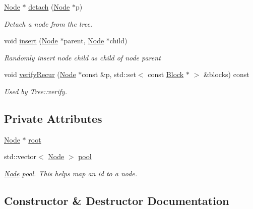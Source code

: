 \begin{DoxyCompactItemize}
\hyperlink{structTTree_1_1Node}{Node} $\ast$ \hyperlink{classTTree_ab9b74f48afd54c16fd1dc3b598019f7f}{detach} (\hyperlink{structTTree_1_1Node}{Node} $\ast$p)
\begin{DoxyCompactList}\small\item\em Detach a node from the tree. \end{DoxyCompactList}\item 
void \hyperlink{classTTree_a0bc18fd4039dc1ae0a53d2b68741a92b}{insert} (\hyperlink{structTTree_1_1Node}{Node} $\ast$parent, \hyperlink{structTTree_1_1Node}{Node} $\ast$child)
\begin{DoxyCompactList}\small\item\em Randomly insert node {\ttfamily child} as child of node {\ttfamily parent} \end{DoxyCompactList}\item 
void \hyperlink{classTTree_ab50938f36651a0cb2077ae84de2576a7}{verify\+Recur} (\hyperlink{structTTree_1_1Node}{Node} $\ast$const \&p, std\+::set$<$ const \hyperlink{structBlock}{Block} $\ast$ $>$ \&blocks) const 
\begin{DoxyCompactList}\small\item\em Used by Tree\+::verify. \end{DoxyCompactList}\end{DoxyCompactItemize}
\subsection*{Private Attributes}
\begin{DoxyCompactItemize}
\item 
\hyperlink{structTTree_1_1Node}{Node} $\ast$ \hyperlink{classTTree_a76972bd24a6d2f940fe1645d008a4a04}{root}
\item 
std\+::vector$<$ \hyperlink{structTTree_1_1Node}{Node} $>$ \hyperlink{classTTree_a58f7a793347834e9caee3d87c7202966}{pool}
\begin{DoxyCompactList}\small\item\em \hyperlink{structTTree_1_1Node}{Node} pool. This helps map an id to a node. \end{DoxyCompactList}\end{DoxyCompactItemize}


\subsection{Constructor \& Destructor Documentation}
\hypertarget{classTTree_a86fa5aaf9e0e661ab3711fc70c99070e}{}
